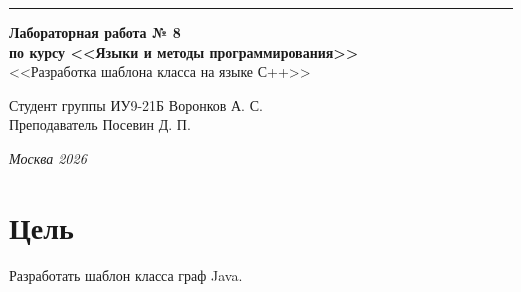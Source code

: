 \documentclass[a4paper, 14pt]{extarticle}
\begin{document}
\begin{titlepage}
\vspace*{-16pt}
\hspace{30pt}\rule{0.866\textwidth}{0.4pt}
  
\vspace{11em}

\begin{center}
\Large {\bf Лабораторная работа № 8} \\ 
\large {\bf по курсу <<Языки и методы программирования>>} \\ 
\large <<Разработка шаблона класса на языке С++>>
\end{center}\normalsize

\vspace{8em}


\begin{flushright}
  {Студент группы ИУ9-21Б Воронков А. С.\hspace*{15pt} \\
  \vspace{2ex}
  Преподаватель Посевин Д. П.\hspace*{15pt}}
\end{flushright}

\bigskip

\vfill
 

\begin{center}
\textsl{Москва 2026}
\end{center}
\end{titlepage}

\renewcommand{\ttdefault}{pcr}

\setlength{\tabcolsep}{3pt}
\newpage
\setcounter{page}{2}

\section{Цель}\label{Sect::task}
\par 
Разработать шаблон класса граф
Java.    

\pagebreak
\end{document}
